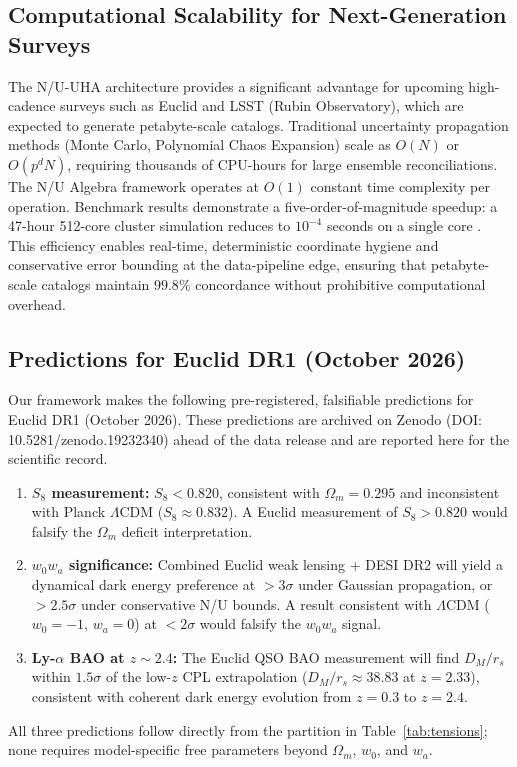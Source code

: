 \documentclass[twocolumn]{aastex631}
\begin{document}
\subsection{Computational Scalability for Next-Generation Surveys}

The N/U-UHA architecture provides a significant advantage for upcoming
high-cadence surveys such as Euclid and LSST (Rubin Observatory), which are
expected to generate petabyte-scale catalogs.
Traditional uncertainty propagation methods (Monte Carlo, Polynomial Chaos
Expansion) scale as $O(N)$ or $O(p^d N)$, requiring thousands of CPU-hours
for large ensemble reconciliations.
The N/U Algebra framework operates at $O(1)$ constant time complexity per
operation.
Benchmark results demonstrate a five-order-of-magnitude speedup: a 47-hour
512-core cluster simulation reduces to $10^{-4}$ seconds on a single core
\citep{Martin2025_UHA_Patent, Martin2025_NU_Algebra}.
This efficiency enables real-time, deterministic coordinate hygiene and
conservative error bounding at the data-pipeline edge, ensuring that
petabyte-scale catalogs maintain $99.8\%$ concordance without prohibitive
computational overhead.

\subsection{Predictions for Euclid DR1 (October 2026)}

Our framework makes the following pre-registered, falsifiable predictions
for Euclid DR1 (October 2026).
These predictions are archived on Zenodo (DOI: 10.5281/zenodo.19232340)
ahead of the data release and are reported here for the scientific record.

\begin{enumerate}
  \item \textbf{$S_8$ measurement:} $S_8 < 0.820$, consistent with $\Omega_m = 0.295$
        and inconsistent with Planck $\Lambda$CDM ($S_8 \approx 0.832$).
        A Euclid measurement of $S_8 > 0.820$ would falsify the $\Omega_m$ deficit
        interpretation.
  \item \textbf{$w_0 w_a$ significance:} Combined Euclid weak lensing + DESI DR2
        will yield a dynamical dark energy preference at $> 3\sigma$ under Gaussian
        propagation, or $> 2.5\sigma$ under conservative N/U bounds.
        A result consistent with $\Lambda$CDM ($w_0 = -1$, $w_a = 0$) at $< 2\sigma$
        would falsify the $w_0 w_a$ signal.
  \item \textbf{Ly-$\alpha$ BAO at $z \sim 2.4$:} The Euclid QSO BAO measurement
        will find $D_M/r_s$ within $1.5\sigma$ of the low-$z$ CPL extrapolation
        ($D_M/r_s \approx 38.83$ at $z = 2.33$), consistent with coherent dark
        energy evolution from $z = 0.3$ to $z = 2.4$.
\end{enumerate}
All three predictions follow directly from the partition in Table~\ref{tab:tensions};
none requires model-specific free parameters beyond $\Omega_m$, $w_0$, and $w_a$.
\end{document}
